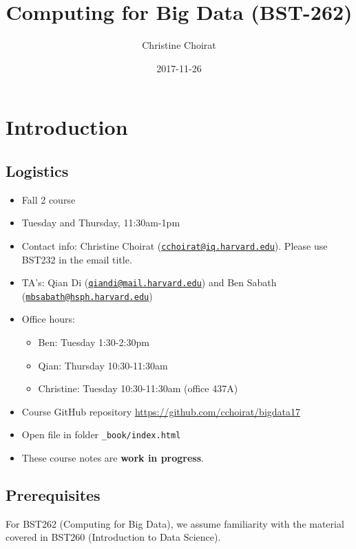 \documentclass[]{book}
\title{Computing for Big Data (BST-262)}
\author{Christine Choirat}
\date{2017-11-26}
\providecommand{\tightlist}{%
  \setlength{\itemsep}{0pt}\setlength{\parskip}{0pt}}
\theoremstyle{definition}
\theoremstyle{definition}
\theoremstyle{definition}
\theoremstyle{remark}
\begin{document}
\maketitle

{
\setcounter{tocdepth}{1}
\tableofcontents
}
\chapter{Introduction}\label{intro}

\section{Logistics}\label{logistics}

\begin{itemize}
\tightlist
\item
  Fall 2 course
\item
  Tuesday and Thursday, 11:30am-1pm
\item
  Contact info: Christine Choirat
  (\href{mailto:cchoirat@iq.harvard.edu}{\nolinkurl{cchoirat@iq.harvard.edu}}).
  Please use BST232 in the email title.
\item
  TA's: Qian Di
  (\href{mailto:qiandi@mail.harvard.edu}{\nolinkurl{qiandi@mail.harvard.edu}})
  and Ben Sabath
  (\href{mailto:mbsabath@hsph.harvard.edu}{\nolinkurl{mbsabath@hsph.harvard.edu}})
\item
  Office hours:

  \begin{itemize}
  \tightlist
  \item
    Ben: Tuesday 1:30-2:30pm
  \item
    Qian: Thursday 10:30-11:30am
  \item
    Christine: Tuesday 10:30-11:30am (office 437A)
  \end{itemize}
\item
  Course GitHub repository \url{https://github.com/cchoirat/bigdata17}
\item
  Open file in folder \texttt{\_book/index.html}
\item
  These course notes are \textbf{work in progress}.
\end{itemize}

\section{Prerequisites}\label{prerequisites}

For BST262 (Computing for Big Data), we assume familiarity with the
material covered in BST260 (Introduction to Data Science).
\end{document}
